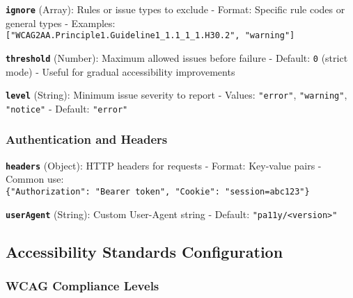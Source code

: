 \textbf{\texttt{ignore}} (Array): Rules or issue types to exclude -
Format: Specific rule codes or general types - Examples:
\texttt{{[}"WCAG2AA.Principle1.Guideline1\_1.1\_1\_1.H30.2",\ "warning"{]}}

\textbf{\texttt{threshold}} (Number): Maximum allowed issues before
failure - Default: \texttt{0} (strict mode) - Useful for gradual
accessibility improvements

\textbf{\texttt{level}} (String): Minimum issue severity to report -
Values: \texttt{"error"}, \texttt{"warning"}, \texttt{"notice"} -
Default: \texttt{"error"}

\subsubsection{Authentication and
Headers}\label{authentication-and-headers}

\textbf{\texttt{headers}} (Object): HTTP headers for requests - Format:
Key-value pairs - Common use:
\texttt{\{"Authorization":\ "Bearer\ token",\ "Cookie":\ "session=abc123"\}}

\textbf{\texttt{userAgent}} (String): Custom User-Agent string -
Default: \texttt{"pa11y/\textless{}version\textgreater{}"}

\subsection{Accessibility Standards
Configuration}\label{accessibility-standards-configuration}

\subsubsection{WCAG Compliance Levels}\label{wcag-compliance-levels}

\begin{Shaded}
\begin{Highlighting}[]
\FunctionTok{\{}
  \FunctionTok{:} \FunctionTok{\{}
    \FunctionTok{:} \FunctionTok{,}
    \FunctionTok{:} \OtherTok{[}\OtherTok{,} \OtherTok{]}\FunctionTok{,}
    \FunctionTok{:} \FunctionTok{,}
    \FunctionTok{:} \FunctionTok{,}
    \FunctionTok{:} 
  \FunctionTok{\}}
\FunctionTok{\}}
\end{Highlighting}
\end{Shaded}

